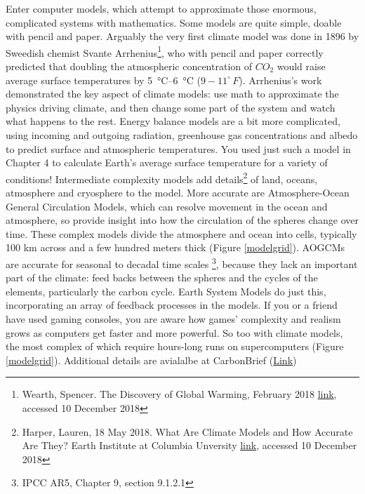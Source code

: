 \documentclass[amstex,12pt]{book}
\begin{document}
Enter computer models, which attempt to approximate those enormous, complicated systems with mathematics. Some models are quite simple, doable with pencil and paper. Arguably the very first climate model was done in 1896 by Sweedish chemist Svante Arrhenius\footnote{Wearth, Spencer. The Discovery of Global Warming, February 2018
\href{shttps://history.aip.org/climate/co2.htm\#S1}{link}, accessed 10 December 2018}, who with pencil and paper correctly predicted that doubling the atmospheric concentration of $CO_2$ would raise average surface temperatures by \SIrange{5}{6}{\celsius} ($9-11 ^\circ\,F$). Arrhenius's work demonstrated the key aspect of climate models: use math to approximate the physics driving climate, and then change some part of the system and watch what happens to the rest. Energy balance models are a bit more complicated, using incoming and outgoing radiation, greenhouse gas concentrations and albedo to predict surface and atmospheric temperatures. You used just such a model in Chapter 4 to calculate Earth's average surface temperature for a variety of conditions! Intermediate complexity models add details\footnote{Harper, Lauren, 18 May 2018. What Are Climate Models and How Accurate Are They? Earth Institute at Columbia Unversity \href{https://blogs.ei.columbia.edu/2018/05/18/climate-models-accuracy}{link}, accessed 10 December 2018} of land, oceans, atmosphere and cryosphere to the model. More accurate are Atmosphere-Ocean General Circulation Models, which can resolve movement in the ocean and atmosphere, so provide insight into how the circulation of the spheres change over time. These complex models divide the atmosphere and ocean into cells, typically 100 km across and a few hundred meters thick (Figure \ref{modelgrid}). AOGCMs are accurate for seasonal to decadal time scales \footnote{IPCC AR5, Chapter 9, section 9.1.2.1}, because they lack an important part of the climate: feed backs between the spheres and the cycles of the elements, particularly the carbon cycle. Earth System Models do just this, incorporating an array of feedback processes in the models. If you or a friend have used gaming consoles, you are aware how games' complexity and realism grows as computers get faster and more powerful. So too with climate models, the most complex of which require hours-long runs on supercomputers (Figure \ref{modelgrid}). Additional details are avialalbe at CarbonBrief (\href{https://www.carbonbrief.org/qa-how-do-climate-models-work}{Link})\\
\end{document}
